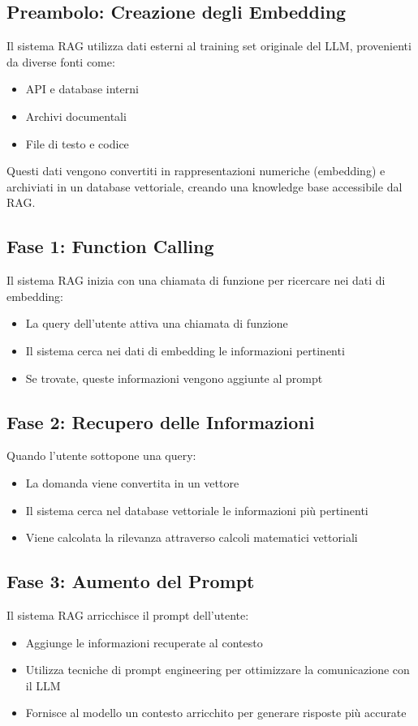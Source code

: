 \documentclass[12pt,a4paper,openright,twoside]{book}
\begin{document}
\subsection{Preambolo: Creazione degli Embedding}
Il sistema RAG utilizza dati esterni al training set originale del LLM, provenienti da diverse fonti come:
\begin{itemize}
    \item API e database interni
    \item Archivi documentali
    \item File di testo e codice
\end{itemize}
Questi dati vengono convertiti in rappresentazioni numeriche (embedding) e archiviati in un database vettoriale, creando una knowledge base accessibile dal RAG.

\subsection{Fase 1: Function Calling}
Il sistema RAG inizia con una chiamata di funzione per ricercare nei dati di embedding:
\begin{itemize}
    \item La query dell'utente attiva una chiamata di funzione
    \item Il sistema cerca nei dati di embedding le informazioni pertinenti
    \item Se trovate, queste informazioni vengono aggiunte al prompt
\end{itemize}

\subsection{Fase 2: Recupero delle Informazioni}
Quando l'utente sottopone una query:
\begin{itemize}
    \item La domanda viene convertita in un vettore
    \item Il sistema cerca nel database vettoriale le informazioni più pertinenti
    \item Viene calcolata la rilevanza attraverso calcoli matematici vettoriali
\end{itemize}

\subsection{Fase 3: Aumento del Prompt}
Il sistema RAG arricchisce il prompt dell'utente:
\begin{itemize}
    \item Aggiunge le informazioni recuperate al contesto
    \item Utilizza tecniche di prompt engineering per ottimizzare la comunicazione con il LLM
    \item Fornisce al modello un contesto arricchito per generare risposte più accurate
\end{itemize}
\end{document}
